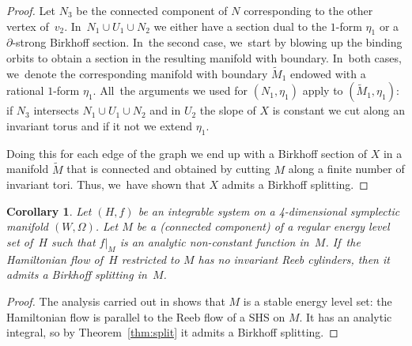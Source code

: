 \documentclass[10pt]{amsart}
\newtheorem{Corollary}[theorem]{Corollary}
\theoremstyle{definition}
\begin{document}
\begin{proof}
Let $N_3$ be the connected component of $N$ corresponding to the other vertex of~$v_2$. In~$N_1\cup U_1\cup N_2$ we either have a section dual to the $1$-form $\eta_1$ or a $\partial$-strong Birkhoff section. In~the second case, we~start by blowing up the binding orbits to obtain a section in the resulting manifold with boundary. In~both cases, we~denote the corresponding manifold with boundary $\widetilde{M}_1$ endowed with a rational $1$-form $\eta_1$.
All~the arguments we used for $(N_1,\eta_1)$ apply to $(\widetilde{M}_1,\eta_1)$: if $N_3$ intersects $N_1\cup U_1\cup N_2$ and in $U_2$ the slope of $X$ is constant we cut along an invariant torus and if it not we extend $\eta_1$.

Doing this for each edge of the graph we end up
with a Birkhoff section of $X$ in a manifold $\widetilde M$ that is connected and obtained by cutting $M$ along a finite number of invariant tori. Thus, we~have shown that $X$ admits a Birkhoff splitting.
\end{proof}

\begin{Corollary}
Let $(H,f)$ be an integrable system on a 4-dimensional symplectic manifold $(W,\Omega)$. Let $M$ be a (connected component) of a regular energy level set of~$H$ such that $f|_M$ is an analytic non-constant function in~$M$. If~the Hamiltonian flow of~$H$ restricted to $M$ has no invariant Reeb cylinders, then it admits a Birkhoff splitting in~$M$.
\end{Corollary}

\begin{proof}
The analysis carried out in \cite[\S\S 2 \& 3]{CV2} shows that $M$ is a stable energy level set: the Hamiltonian flow is parallel to the Reeb flow of a SHS on $M$. It has an analytic integral, so by Theorem~\ref{thm:split} it admits a Birkhoff splitting.
\end{proof}
\end{document}
